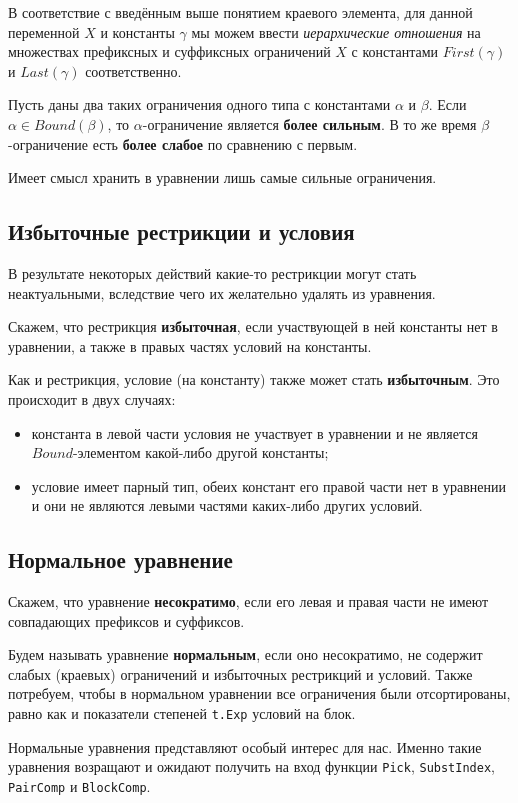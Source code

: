 \documentclass[12pt]{article}
\begin{document}
В соответствие с введённым выше понятием краевого элемента, для данной
переменной $X$ и константы $\gamma$ мы можем ввести \textit{иерархические
отношения} на множествах префиксных и суффиксных ограничений $X$ с константами
$First(\gamma)$ и $Last(\gamma)$ соответственно.

Пусть даны два таких ограничения одного типа с константами $\alpha$ и $\beta$.
Если $\alpha \in Bound(\beta)$, то $\alpha$-ограничение является
\textbf{более сильным}. В то же время $\beta$-ограничение есть
\textbf{более слабое} по сравнению с первым.

Имеет смысл хранить в уравнении лишь самые сильные ограничения.

\subsection{Избыточные рестрикции и условия}

В результате некоторых действий какие-то рестрикции могут стать неактуальными,
вследствие чего их желательно удалять из уравнения.

Скажем, что рестрикция \textbf{избыточная}, если участвующей в ней константы
нет в уравнении, а также в правых частях условий на константы.

Как и рестрикция, условие (на константу) также может стать \textbf{избыточным}.
Это происходит в двух случаях:
\begin{itemize}
  \item константа в левой части условия не участвует в уравнении и не является
  $Bound$-элементом какой-либо другой константы;
  \item условие имеет парный тип, обеих констант его правой части нет
  в уравнении и они не являются левыми частями каких-либо других условий.
\end{itemize}

\subsection{Нормальное уравнение}

Скажем, что уравнение \textbf{несократимо}, если его левая и правая части не
имеют совпадающих префиксов и суффиксов.

Будем называть уравнение \textbf{нормальным}, если оно несократимо, не содержит
слабых (краевых) ограничений и избыточных рестрикций и условий. Также
потребуем, чтобы в нормальном уравнении все ограничения были отсортированы,
равно как и показатели степеней \texttt{t.Exp} условий на блок.

Нормальные уравнения представляют особый интерес для нас. Именно такие уравнения
возращают и ожидают получить на вход функции \texttt{Pick}, \texttt{SubstIndex},
\texttt{PairComp} и \texttt{BlockComp}.
\end{document}
